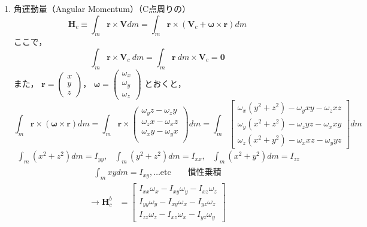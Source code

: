 \documentclass[class=article, crop=false, dvipdfmx, fleqn]{standalone}
\begin{document}
\begin{enumerate}[label = \maru{\theenumi}]
\item 角運動量（Angular Momentum）（C点周りの）
\begin{equation}
 \bm{H}_c 
 \equiv
 \int_m \bm{r} \times \bm{V} dm 
 =\int_m \bm{r} \times (\bm{V}_c + \bm{\omega} \times \bm{r}) dm
 \end{equation}
ここで，
\begin{equation}
\int_m \bm{r} \times \bm{V}_c \ dm 
= \int_m \bm{r} \ dm \times \bm{V}_c 
= \bm{0}
\end{equation}
また，
$\bm{r} = \begin{pmatrix} x \\ y \\ z \end{pmatrix}$，
$\bm{\omega} = \begin{pmatrix} \omega_x \\ \omega_y \\ \omega_z \end{pmatrix}$
とおくと，
\begin{equation}
\int_m \bm{r} \times (\bm{\omega} \times \bm{r}) dm = \int_m \bm{r} \times
\begin{pmatrix}
\omega_y z - \omega_z y \\
\omega_z x - \omega_x z \\
\omega_x y - \omega_y x \\
\end{pmatrix}
dm
=
\int_m 
\begin{bmatrix}
\omega_x (y^2 + z^2) - \omega_y xy - \omega_z xz \\
\omega_y (x^2 + z^2) - \omega_z yz - \omega_x xy \\
\omega_z (x^2 + y^2) - \omega_x xz - \omega_y yz
\end{bmatrix}
dm
\end{equation}
\begin{align}
\int_m (x^2 + z^2) dm = I_{yy}, &
\int_m (y^2 + z^2) dm = I_{xx}, &
\int_m (x^2 + y^2) dm = I_{zz}
\end{align}
\begin{align}
\int_m xy dm = I_{xy}, \dots \text{etc}
\qquad\text{慣性乗積}
\end{align}
\begin{align}
\rightarrow
\bm{H}_c^b & =
\begin{bmatrix}
I_{xx} \omega_x 
- I_{xy}\omega_y
- I_{xz}\omega_z \\
I_{yy} \omega_y
-I_{xy}\omega_x
- I_{yz}\omega_z \\
I_{zz} \omega_z 
- I_{xz}\omega_x 
- I_{yz}\omega_y
\end{bmatrix}

\end{align}
\end{enumerate}
\end{document}
